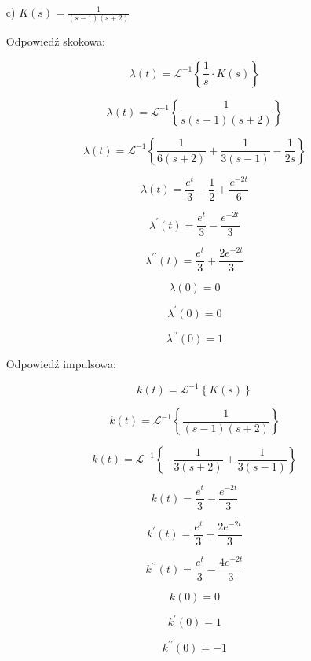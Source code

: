 \documentclass{article}
\begin{document}
\begin{enumerate}
    \item[c)]  $K(s)=\frac{1}{\left(s - 1\right) \left(s + 2\right)}$

    Odpowiedź skokowa:

    $$ \lambda(t)=\mathcal{L}^{-1}\left\{\frac{1}{s}\cdot K(s)\right\} $$

    $$ \lambda(t)=\mathcal{L}^{-1}\left\{\frac{1}{s \left(s - 1\right) \left(s + 2\right)}\right\} $$

    $$ \lambda(t)=\mathcal{L}^{-1}\left\{\frac{1}{6 \left(s + 2\right)} + \frac{1}{3 \left(s - 1\right)} - \frac{1}{2 s}\right\}$$

    $$ \lambda(t)=\frac{e^{t}}{3} - \frac{1}{2} + \frac{e^{- 2 t}}{6}$$

    $$ \lambda^{\prime}(t)=\frac{e^{t}}{3} - \frac{e^{- 2 t}}{3}$$

    $$ \lambda^{\prime\prime}(t)=\frac{e^{t}}{3} + \frac{2 e^{- 2 t}}{3}$$

    $$ \lambda(0)=0 $$

    $$ \lambda^{\prime}(0)=0$$

    $$ \lambda^{\prime\prime}(0)=1$$

    \newpage

    Odpowiedź impulsowa:

    $$ k(t)=\mathcal{L}^{-1}\left\{K(s)\right\} $$

    $$ k(t)=\mathcal{L}^{-1}\left\{\frac{1}{\left(s - 1\right) \left(s + 2\right)}\right\} $$

    $$ k(t)=\mathcal{L}^{-1}\left\{- \frac{1}{3 \left(s + 2\right)} + \frac{1}{3 \left(s - 1\right)}\right\} $$

    $$ k(t)=\frac{e^{t}}{3} - \frac{e^{- 2 t}}{3}$$

    $$ k^{\prime}(t)=\frac{e^{t}}{3} + \frac{2 e^{- 2 t}}{3}$$

    $$ k^{\prime\prime}(t)=\frac{e^{t}}{3} - \frac{4 e^{- 2 t}}{3}$$

    $$ k(0)=0$$

    $$ k^{\prime}(0)=1$$

    $$ k^{\prime\prime}(0)=-1$$
\end{enumerate}
\end{document}
